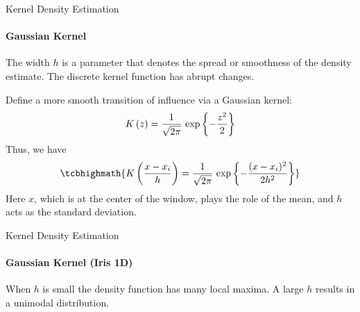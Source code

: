 \begin{frame}{Kernel Density Estimation}
\framesubtitle{Gaussian Kernel}
The width $h$ is a parameter that
denotes the spread or smoothness of the density estimate.
The discrete kernel function has abrupt changes. 

\medskip
Def\/{i}ne a more smooth
transition of influence via a Gaussian kernel:
\begin{align*}
  K\left(z\right) =
  \frac{1}{\sqrt{2\pi}}\,\exp\left\{-\frac{z^2}{2}\right\}
\end{align*}
Thus, we have
\begin{align*}
\tcbhighmath{
  K\left(\frac{x-x_i}{h}\right) =
  \frac{1}{\sqrt{2\pi}}\,\exp\lB\{-\frac{(x-x_i)^2}{2h^2}\rB\}
}
\end{align*}
Here $x$, which is at the center of the window, plays the role of
the mean, and $h$ acts as the standard deviation.
\end{frame}


\begin{frame}[fragile]{Kernel Density Estimation}
\framesubtitle{Gaussian Kernel (Iris 1D)}
\setcounter{subfigure}{0}
\vspace*{-0.7cm}
\begin{figure}[!t]%
\centerline{
\hspace{-0.3in}
}
\vspace*{-0.7cm}
\centerline{
\hspace{-0.3in}
}
\end{figure}
\small
  When $h$ is small
the density function has many
  local maxima. A large $h$ results in a unimodal distribution.

\end{frame}


